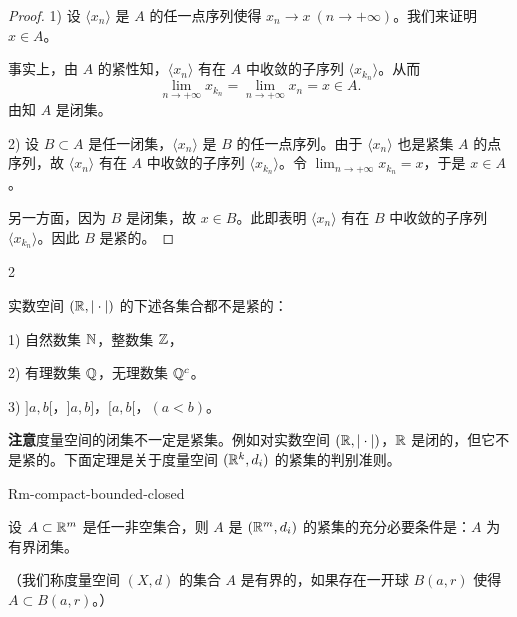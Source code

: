 \begin{proof}

1) 设 $\langle x_n\rangle$ 是 $A$ 的任一点序列使得 $x_n\to x\ (n\to+\infty)$。我们来证明 $x\in A$。

事实上，由 $A$ 的紧性知，$\langle x_n\rangle$ 有在 $A$ 中收敛的子序列 $\langle x_{k_n}\rangle$。从而
\[\lim_{n\to+\infty}x_{k_n}=\lim_{n\to+\infty}x_n=x\in A.\]
由知 $A$ 是闭集。

2) 设 $B\subset A$ 是任一闭集，$\langle x_n\rangle$ 是 $B$ 的任一点序列。由于 $\langle x_n\rangle$ 也是紧集 $A$ 的点序列，故 $\langle x_n\rangle$ 有在 $A$ 中收敛的子序列 $\langle x_{k_n}\rangle$。令 $\displaystyle\lim_{n\to+\infty}x_{k_n}=x$，于是 $x\in A$。

另一方面，因为 $B$ 是闭集，故 $x\in B$。此即表明 $\langle x_n\rangle$ 有在 $B$ 中收敛的子序列 $\langle x_{k_n}\rangle$。因此 $B$ 是紧的。

\end{proof}

\begin{sourceexample}{2}

实数空间 $(\mathbb{R},|\cdot|)$ 的下述各集合都不是紧的：

1) 自然数集 $\mathbb{N}$，整数集 $\mathbb{Z}$，

2) 有理数集 $\mathbb{Q}$，无理数集 $\mathbb{Q}^c$。

3) $]a,b[$，$]a,b]$，$[a,b[$，$(a<b)$。

\end{sourceexample}

\textbf{注意}\quad 度量空间的闭集不一定是紧集。例如对实数空间 $(\mathbb{R},|\cdot|)$，$\mathbb{R}$ 是闭的，但它不是紧的。下面定理是关于度量空间 $(\mathbb{R}^k,d_i)$ 的紧集的判别准则。

\begin{mythm}{}{Rm-compact-bounded-closed}

设 $A\subset\mathbb{R}^m$ 是任一非空集合，则 $A$ 是 $(\mathbb{R}^m,d_i)$ 的紧集的充分必要条件是：$A$ 为有界闭集。

（我们称度量空间 $(X,d)$ 的集合 $A$ 是有界的，如果存在一开球 $B(a,r)$ 使得 $A\subset B(a,r)$。）

\end{mythm}

